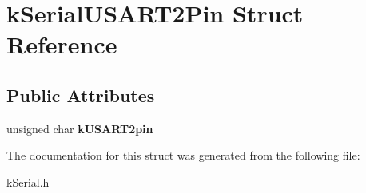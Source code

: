 \hypertarget{structkSerialUSART2Pin}{}\section{k\+Serial\+U\+S\+A\+R\+T2\+Pin Struct Reference}
\label{structkSerialUSART2Pin}
\subsection*{Public Attributes}
\begin{DoxyCompactItemize}
\item 
unsigned char {\bfseries k\+U\+S\+A\+R\+T2pin}\hypertarget{structkSerialUSART2Pin_aced072c52f8d3d0e2181ad84c089356d}{}\label{structkSerialUSART2Pin_aced072c52f8d3d0e2181ad84c089356d}

\end{DoxyCompactItemize}


The documentation for this struct was generated from the following file\+:\begin{DoxyCompactItemize}
\item 
k\+Serial.\+h\end{DoxyCompactItemize}
